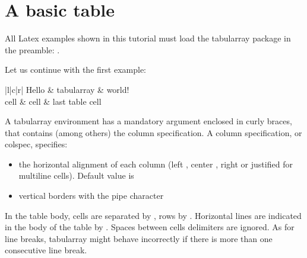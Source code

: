 \section{A basic table}

All Latex examples shown in this tutorial must load the tabularray package in the preamble: .

Let us continue with the first example:

\begin{Code}
\begin{tblr}{|l|c|r|}
	\hline
	Hello & tabularray  & world! \\
	\hline
	cell  & cell        & last table cell \\
	\hline
\end{tblr}
\end{Code}

A tabularray environment has a mandatory argument enclosed in curly braces, that contains (among others) the column specification. A column specification, or colspec, specifies:
\begin{itemize}
	\item the horizontal alignment of each column (left , center , right  or justified  for multiline cells). Default value is 
	\item vertical borders with the pipe character \snippet{|}
\end{itemize}

In the table body, cells are separated by \snippet{\&}, rows by \snippet{\textbackslash\textbackslash}. Horizontal lines are indicated in the body of the table by . Spaces between cells delimiters \snippet{\&} are ignored. As for line breaks, tabularray might behave incorrectly if there is more than one consecutive line break.


